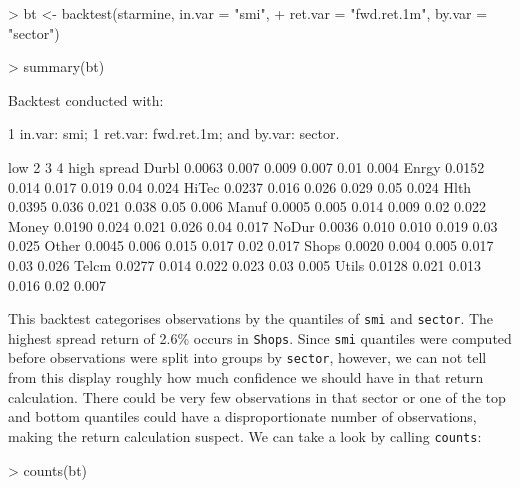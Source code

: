 \documentclass[a4paper]{report}
\begin{document}
\begin{article}
\begin{Schunk}
\begin{Sinput}
> bt <- backtest(starmine, in.var = "smi", 
+     ret.var = "fwd.ret.1m", by.var = "sector")
\end{Sinput}
\end{Schunk}


\begin{Schunk}
\begin{Sinput}
> summary(bt)
\end{Sinput}
\begin{Soutput}
Backtest conducted with:

1 in.var: smi;
1 ret.var: fwd.ret.1m;
and by.var: sector.

         low     2     3     4 high spread
Durbl 0.0063 0.007 0.009 0.007 0.01  0.004
Enrgy 0.0152 0.014 0.017 0.019 0.04  0.024
HiTec 0.0237 0.016 0.026 0.029 0.05  0.024
Hlth  0.0395 0.036 0.021 0.038 0.05  0.006
Manuf 0.0005 0.005 0.014 0.009 0.02  0.022
Money 0.0190 0.024 0.021 0.026 0.04  0.017
NoDur 0.0036 0.010 0.010 0.019 0.03  0.025
Other 0.0045 0.006 0.015 0.017 0.02  0.017
Shops 0.0020 0.004 0.005 0.017 0.03  0.026
Telcm 0.0277 0.014 0.022 0.023 0.03  0.005
Utils 0.0128 0.021 0.013 0.016 0.02  0.007
\end{Soutput}
\end{Schunk}


This backtest categorises observations by the quantiles of
\texttt{smi} and \texttt{sector}.  The highest spread return of 2.6\%
occurs in \texttt{Shops}.  Since \texttt{smi} quantiles were computed
before observations were split into groups by \texttt{sector},
however, we can not tell from this display roughly how much confidence
we should have in that return calculation.  There could be very few
observations in that sector or one of the top and bottom quantiles
could have a disproportionate number of observations, making the
return calculation suspect.  We can take a look by calling
\texttt{counts}:

\begin{Schunk}
\begin{Sinput}
> counts(bt)
\end{Sinput}
\end{Schunk}


\end{article}
\end{document}
